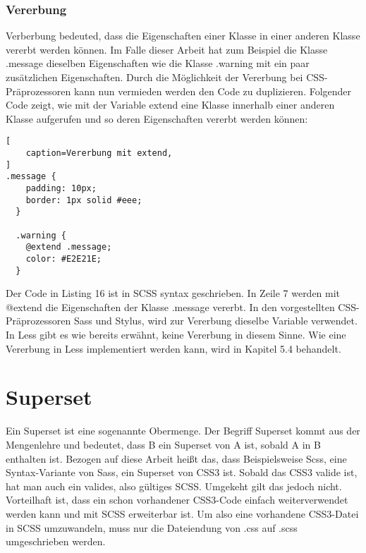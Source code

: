 \subsubsection{Vererbung}
Verberbung bedeuted, dass die Eigenschaften einer Klasse in einer anderen Klasse vererbt werden können. Im Falle dieser Arbeit hat zum Beispiel die Klasse .message dieselben Eigenschaften wie die Klasse .warning mit ein paar zusätzlichen Eigenschaften. Durch die Möglichkeit der Vererbung bei CSS-Präprozessoren kann nun vermieden werden den Code zu duplizieren. Folgender Code zeigt, wie mit der Variable extend eine Klasse innerhalb einer anderen Klasse aufgerufen und so deren Eigenschaften vererbt werden können:
\begin{lstlisting}[
	caption=Vererbung mit extend,
]
.message {
    padding: 10px;
    border: 1px solid #eee;
  }

  .warning {
    @extend .message;
    color: #E2E21E;
  }
\end{lstlisting}
Der Code in Listing 16 ist in SCSS syntax geschrieben. In Zeile 7 werden mit @extend die Eigenschaften der Klasse .message vererbt. In den vorgestellten CSS-Präprozessoren Sass und Stylus, wird zur Vererbung dieselbe Variable verwendet. In Less gibt es wie bereits erwähnt, keine Vererbung in diesem Sinne. Wie eine Vererbung in Less implementiert werden kann, wird in Kapitel 5.4 behandelt.
\newpage
\section{Superset} 
Ein Superset ist eine sogenannte Obermenge. Der Begriff Superset kommt aus der Mengenlehre und bedeutet, dass B ein Superset von A ist, sobald A in B enthalten ist. Bezogen auf diese Arbeit heißt das, dass Beispielsweise Scss, eine Syntax-Variante von Sass, ein Superset von CSS3 ist.\newline
Sobald das CSS3 valide ist, hat man auch ein valides, also gültiges SCSS. Umgekeht gilt das jedoch nicht.  Vorteilhaft ist, dass ein schon vorhandener CSS3-Code einfach weiterverwendet werden kann und mit SCSS erweiterbar ist. Um also eine vorhandene CSS3-Datei in SCSS umzuwandeln, muss nur die Dateiendung von .css auf .scss umgeschrieben werden.

